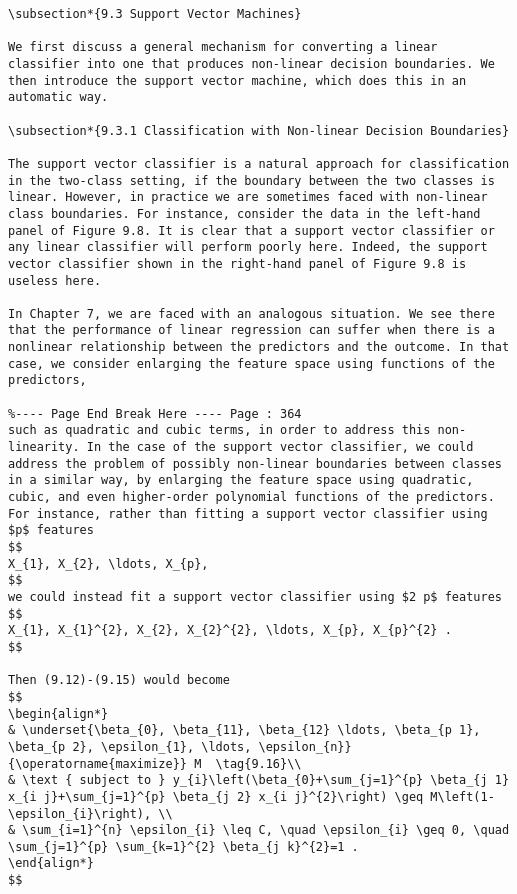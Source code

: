 \documentclass[10pt]{article}
\begin{document}
\begin{verbatim}
\subsection*{9.3 Support Vector Machines}

We first discuss a general mechanism for converting a linear classifier into one that produces non-linear decision boundaries. We then introduce the support vector machine, which does this in an automatic way.

\subsection*{9.3.1 Classification with Non-linear Decision Boundaries}

The support vector classifier is a natural approach for classification in the two-class setting, if the boundary between the two classes is linear. However, in practice we are sometimes faced with non-linear class boundaries. For instance, consider the data in the left-hand panel of Figure 9.8. It is clear that a support vector classifier or any linear classifier will perform poorly here. Indeed, the support vector classifier shown in the right-hand panel of Figure 9.8 is useless here.

In Chapter 7, we are faced with an analogous situation. We see there that the performance of linear regression can suffer when there is a nonlinear relationship between the predictors and the outcome. In that case, we consider enlarging the feature space using functions of the predictors,

%---- Page End Break Here ---- Page : 364
such as quadratic and cubic terms, in order to address this non-linearity. In the case of the support vector classifier, we could address the problem of possibly non-linear boundaries between classes in a similar way, by enlarging the feature space using quadratic, cubic, and even higher-order polynomial functions of the predictors. For instance, rather than fitting a support vector classifier using $p$ features
$$
X_{1}, X_{2}, \ldots, X_{p},
$$
we could instead fit a support vector classifier using $2 p$ features
$$
X_{1}, X_{1}^{2}, X_{2}, X_{2}^{2}, \ldots, X_{p}, X_{p}^{2} .
$$

Then (9.12)-(9.15) would become
$$
\begin{align*}
& \underset{\beta_{0}, \beta_{11}, \beta_{12} \ldots, \beta_{p 1}, \beta_{p 2}, \epsilon_{1}, \ldots, \epsilon_{n}}{\operatorname{maximize}} M  \tag{9.16}\\
& \text { subject to } y_{i}\left(\beta_{0}+\sum_{j=1}^{p} \beta_{j 1} x_{i j}+\sum_{j=1}^{p} \beta_{j 2} x_{i j}^{2}\right) \geq M\left(1-\epsilon_{i}\right), \\
& \sum_{i=1}^{n} \epsilon_{i} \leq C, \quad \epsilon_{i} \geq 0, \quad \sum_{j=1}^{p} \sum_{k=1}^{2} \beta_{j k}^{2}=1 .
\end{align*}
$$


\end{verbatim}
\end{document}
